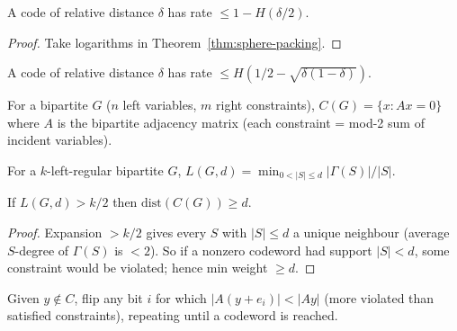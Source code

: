 \begin{corollary}
  \label{cor:sphere-packing-rate}
  A code of relative distance $\delta$ has rate $\le1-H(\delta/2)$.
\end{corollary}
\begin{proof}
  Take logarithms in Theorem~\ref{thm:sphere-packing}.
\end{proof}

\begin{theorem}
  \label{thm:mrrw}
  \notready
  A code of relative distance $\delta$ has rate $\le H(1/2-\sqrt{\delta(1-\delta)})$.
\end{theorem}

\begin{construction}
  \label{constr:code-from-graph}
  For a bipartite $G$ ($n$ left variables, $m$ right constraints), $C(G)=\{x:
  Ax=0\}$ where $A$ is the bipartite adjacency matrix (each constraint = mod-2
  sum of incident variables).
\end{construction}

\begin{definition}
  \label{def:left-expansion}
  For a $k$-left-regular bipartite $G$, $L(G,d)=\min_{0<|S|\le d}|\Gamma(S)|/|S|$.
\end{definition}

\begin{theorem}
  \label{thm:ss-distance}
  If $L(G,d)>k/2$ then $\mathrm{dist}(C(G))\ge d$.
\end{theorem}
\begin{proof}
  Expansion $>k/2$ gives every $S$ with $|S|\le d$ a unique neighbour (average
  $S$-degree of $\Gamma(S)$ is $<2$). So if a nonzero codeword had support
  $|S|<d$, some constraint would be violated; hence min weight $\ge d$.
\end{proof}

\begin{construction}
  \label{constr:belief-propagation}
  Given $y\notin C$, flip any bit $i$ for which $|A(y+e_i)|<|Ay|$ (more violated
  than satisfied constraints), repeating until a codeword is reached.
\end{construction}

